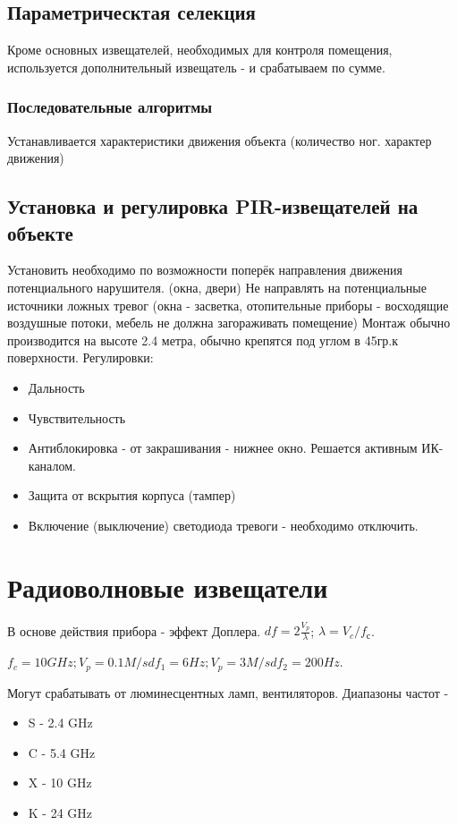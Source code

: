 \documentclass[a4paper,12pt]{report}
\begin{document}
	\subsection{Параметрическтая селекция}
	Кроме основных извещателей, необходимых для контроля помещения, используется дополнительный извещатель - и срабатываем по сумме.

	\subsubsection{Последовательные алгоритмы}
	Устанавливается характеристики движения объекта (количество ног. характер движения)

	\subsection{Установка и регулировка PIR-извещателей на объекте}

	Установить необходимо по возможности поперёк направления движения потенциального нарушителя. (окна, двери)
	Не направлять на потенциальные источники ложных тревог (окна - засветка, отопительные приборы - восходящие воздушные потоки, мебель не должна загораживать помещение)
	Монтаж обычно производится на высоте 2.4 метра, обычно крепятся под углом в 45гр.к поверхности.
	Регулировки:
	\begin{itemize}
	\item	Дальность
	\item	Чувствительность
	\item	Антиблокировка - от закрашивания - нижнее окно. Решается активным ИК-каналом.
	\item	Защита от вскрытия корпуса (тампер)
	\item	Включение (выключение) светодиода тревоги - необходимо отключить.
	\end{itemize}


	\section{Радиоволновые извещатели}

	В основе действия прибора - эффект Доплера. $df = 2\frac{V_p}{\lambda}$; $\lambda = V_c / f_с$.

	$f_c = 10GHz; V_p = 0.1M/s df_1 = 6Hz; V_p = 3M/s df_2 = 200Hz$.

	Могут срабатывать от люминесцентных ламп, вентиляторов.
	Диапазоны частот -
	\begin{itemize}
	\item	S - 2.4 GHz
	\item	C - 5.4 GHz
	\item	X - 10 GHz
	\item	K - 24 GHz
	\end{itemize}
\end{document}
